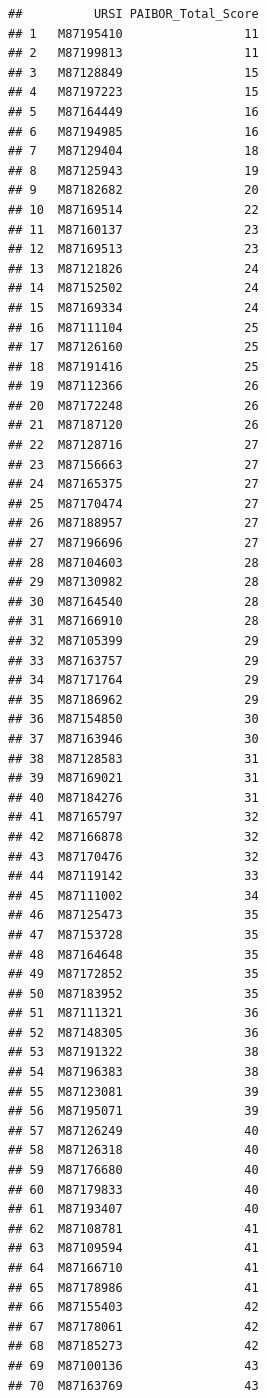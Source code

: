 \documentclass[
  man]{apa6}
\begin{document}
\begin{verbatim}
##          URSI PAIBOR_Total_Score
## 1   M87195410                 11
## 2   M87199813                 11
## 3   M87128849                 15
## 4   M87197223                 15
## 5   M87164449                 16
## 6   M87194985                 16
## 7   M87129404                 18
## 8   M87125943                 19
## 9   M87182682                 20
## 10  M87169514                 22
## 11  M87160137                 23
## 12  M87169513                 23
## 13  M87121826                 24
## 14  M87152502                 24
## 15  M87169334                 24
## 16  M87111104                 25
## 17  M87126160                 25
## 18  M87191416                 25
## 19  M87112366                 26
## 20  M87172248                 26
## 21  M87187120                 26
## 22  M87128716                 27
## 23  M87156663                 27
## 24  M87165375                 27
## 25  M87170474                 27
## 26  M87188957                 27
## 27  M87196696                 27
## 28  M87104603                 28
## 29  M87130982                 28
## 30  M87164540                 28
## 31  M87166910                 28
## 32  M87105399                 29
## 33  M87163757                 29
## 34  M87171764                 29
## 35  M87186962                 29
## 36  M87154850                 30
## 37  M87163946                 30
## 38  M87128583                 31
## 39  M87169021                 31
## 40  M87184276                 31
## 41  M87165797                 32
## 42  M87166878                 32
## 43  M87170476                 32
## 44  M87119142                 33
## 45  M87111002                 34
## 46  M87125473                 35
## 47  M87153728                 35
## 48  M87164648                 35
## 49  M87172852                 35
## 50  M87183952                 35
## 51  M87111321                 36
## 52  M87148305                 36
## 53  M87191322                 38
## 54  M87196383                 38
## 55  M87123081                 39
## 56  M87195071                 39
## 57  M87126249                 40
## 58  M87126318                 40
## 59  M87176680                 40
## 60  M87179833                 40
## 61  M87193407                 40
## 62  M87108781                 41
## 63  M87109594                 41
## 64  M87166710                 41
## 65  M87178986                 41
## 66  M87155403                 42
## 67  M87178061                 42
## 68  M87185273                 42
## 69  M87100136                 43
## 70  M87163769                 43

\end{verbatim}
\end{document}
